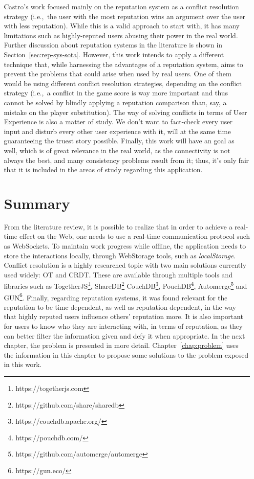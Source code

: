 Castro's work focused mainly on the reputation system as a conflict resolution strategy (i.e.,\ the user with the most reputation wins an argument over the user with less reputation). While this is a valid approach to start with, it has many limitations such as highly-reputed users abusing their power in the real world. Further discussion about reputation systems in the literature is shown in Section~\ref{sec:rep-sys-sota}. However, this work intends to apply a different technique that, while harnessing the advantages of a reputation system, aims to prevent the problems that could arise when used by real users. One of them would be using different conflict resolution strategies, depending on the conflict strategy (i.e.,\ a conflict in the game score is way more important and thus cannot be solved by blindly applying a reputation comparison than, say, a mistake on the player substitution). The way of solving conflicts in terms of User Experience is also a matter of study. We don't want to fact-check every user input and disturb every other user experience with it, will at the same time guaranteeing the truest story possible. Finally, this work will have an  goal as well, which is of great relevance in the real world, as the connectivity is not always the best, and many consistency problems result from it; thus, it's only fair that it is included in the areas of study regarding this application.

\section{Summary}

From the literature review, it is possible to realize that in order to achieve a real-time effect on the Web, one needs to use a real-time communication protocol such as WebSockets. To maintain work progress while offline, the application needs to store the interactions locally, through WebStorage tools, such as \textit{localStorage}. Conflict resolution is a highly researched topic with two main solutions currently used widely: OT and CRDT. These are available through multiple tools and libraries such as TogetherJS\footnote{https://togetherjs.com}, ShareDB\footnote{https://github.com/share/sharedb} CouchDB\footnote{https://couchdb.apache.org/}, PouchDB\footnote{https://pouchdb.com/}, Automerge\footnote{https://github.com/automerge/automerge} and GUN\footnote{https://gun.eco/}. Finally, regarding reputation systems, it was found relevant for the reputation to be time-dependent, as well as reputation dependent, in the way that highly reputed users influence others' reputation more. It is also important for users to know who they are interacting with, in terms of reputation, as they can better filter the information given and defy it when appropriate. In the next chapter, the problem is presented in more detail. Chapter~\ref{chap:problem} uses the information in this chapter to propose some solutions to the problem exposed in this work. 